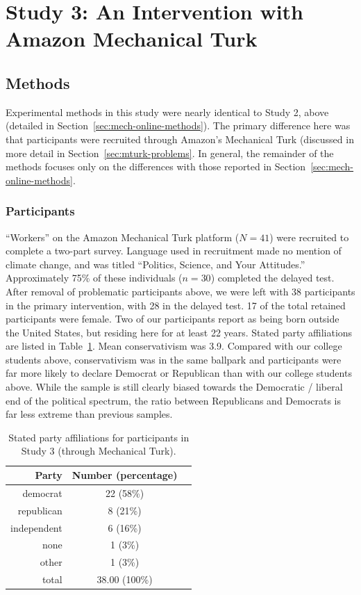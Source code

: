 \section{Study 3: An Intervention with Amazon Mechanical Turk}
\label{sec:mech-mturk}

\subsection{Methods}

Experimental methods in this study were nearly identical to Study 2, above
(detailed in Section~\ref{sec:mech-online-methods}). The primary difference here
was that participants were recruited through Amazon's Mechanical Turk (discussed
in more detail in Section~\ref{sec:mturk-problems}. In general, the remainder of the
methods focuses only on the differences with those reported in
Section~\ref{sec:mech-online-methods}.

\subsubsection{Participants}

“Workers” on the Amazon Mechanical Turk platform ($N=41$) were recruited to
complete a two-part survey. Language used in recruitment made no mention of
climate change, and was titled “Politics, Science, and Your Attitudes.”
Approximately 75\% of these individuals ($n=30$) completed the delayed test.
After removal of problematic participants above, we were left with 38
participants in the primary intervention, with 28 in the delayed test. 17 of the
total retained participants were female. Two of our participants report as being
born outside the United States, but residing here for at least 22 years. Stated
party affiliations are listed in Table~\ref{table:cco-mech-party}. Mean
conservativism was 3.9. Compared with our college students above, conservativism
was in the same ballpark and participants were far more likely to declare
Democrat or Republican than with our college students above. While the sample is
still clearly biased towards the Democratic / liberal end of the political
spectrum, the ratio between Republicans and Democrats is far less extreme than
previous samples. 

\begin{table}[ht]
    \caption{Stated party affiliations for participants in Study 3 (through
        Mechanical Turk).}
    \label{table:cco-mech-party}
\centering
\begin{tabular}{rcc}
  \toprule
 Party & Number (percentage) \\ 
  \midrule
  democrat     & 22 (58\%) \\ 
  republican   & 8 (21\%) \\ 
  independent  & 6 (16\%) \\ 
  none         & 1 (3\%) \\ 
  other        & 1 (3\%) \\ 
  \midrule
  total        & 38.00 (100\%) \\ 
   \bottomrule
\end{tabular}
\end{table}

